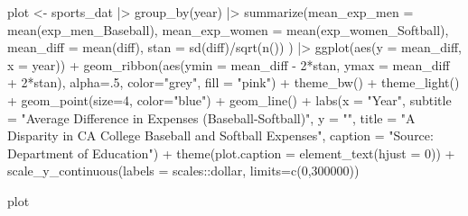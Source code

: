 \documentclass[
  letterpaper,
  DIV=11,
  numbers=noendperiod]{scrartcl}
\newenvironment{Shaded}{\begin{snugshade}}{\end{snugshade}}
\newcommand{\AttributeTok}[1]{\textcolor[rgb]{0.40,0.45,0.13}{#1}}
\newcommand{\DecValTok}[1]{\textcolor[rgb]{0.68,0.00,0.00}{#1}}
\newcommand{\FunctionTok}[1]{\textcolor[rgb]{0.28,0.35,0.67}{#1}}
\newcommand{\NormalTok}[1]{\textcolor[rgb]{0.00,0.23,0.31}{#1}}
\newcommand{\OtherTok}[1]{\textcolor[rgb]{0.00,0.23,0.31}{#1}}
\newcommand{\SpecialCharTok}[1]{\textcolor[rgb]{0.37,0.37,0.37}{#1}}
\newcommand{\StringTok}[1]{\textcolor[rgb]{0.13,0.47,0.30}{#1}}
\begin{document}
\begin{Shaded}
\begin{Highlighting}[]
\NormalTok{plot }\OtherTok{\textless{}{-}}\NormalTok{ sports\_dat }\SpecialCharTok{|\textgreater{}}
  \FunctionTok{group\_by}\NormalTok{(year) }\SpecialCharTok{|\textgreater{}}
  \FunctionTok{summarize}\NormalTok{(}\AttributeTok{mean\_exp\_men =} \FunctionTok{mean}\NormalTok{(exp\_men\_Baseball), }
            \AttributeTok{mean\_exp\_women =} \FunctionTok{mean}\NormalTok{(exp\_women\_Softball),}
            \AttributeTok{mean\_diff =} \FunctionTok{mean}\NormalTok{(diff),}
            \AttributeTok{stan =} \FunctionTok{sd}\NormalTok{(diff)}\SpecialCharTok{/}\FunctionTok{sqrt}\NormalTok{(}\FunctionTok{n}\NormalTok{())}
\NormalTok{  ) }\SpecialCharTok{|\textgreater{}}
  \FunctionTok{ggplot}\NormalTok{(}\FunctionTok{aes}\NormalTok{(}\AttributeTok{y =}\NormalTok{ mean\_diff, }\AttributeTok{x =}\NormalTok{ year)) }\SpecialCharTok{+}
  \FunctionTok{geom\_ribbon}\NormalTok{(}\FunctionTok{aes}\NormalTok{(}\AttributeTok{ymin =}\NormalTok{ mean\_diff }\SpecialCharTok{{-}} \DecValTok{2}\SpecialCharTok{*}\NormalTok{stan, }\AttributeTok{ymax =}\NormalTok{ mean\_diff }\SpecialCharTok{+} \DecValTok{2}\SpecialCharTok{*}\NormalTok{stan), }
              \AttributeTok{alpha=}\NormalTok{.}\DecValTok{5}\NormalTok{, }
              \AttributeTok{color=}\StringTok{"grey"}\NormalTok{,}
              \AttributeTok{fill =} \StringTok{"pink"}\NormalTok{) }\SpecialCharTok{+}
  \FunctionTok{theme\_bw}\NormalTok{() }\SpecialCharTok{+}
  \FunctionTok{theme\_light}\NormalTok{() }\SpecialCharTok{+}
  \FunctionTok{geom\_point}\NormalTok{(}\AttributeTok{size=}\DecValTok{4}\NormalTok{, }\AttributeTok{color=}\StringTok{"blue"}\NormalTok{) }\SpecialCharTok{+}
  \FunctionTok{geom\_line}\NormalTok{() }\SpecialCharTok{+}
  \FunctionTok{labs}\NormalTok{(}\AttributeTok{x =} \StringTok{"Year"}\NormalTok{, }
       \AttributeTok{subtitle =} \StringTok{"Average Difference in Expenses (Baseball{-}Softball)"}\NormalTok{,}
       \AttributeTok{y =} \StringTok{""}\NormalTok{, }
       \AttributeTok{title =} \StringTok{"A Disparity in CA College Baseball and Softball Expenses"}\NormalTok{, }
       \AttributeTok{caption =} \StringTok{"Source: Department of Education"}\NormalTok{) }\SpecialCharTok{+}
  \FunctionTok{theme}\NormalTok{(}\AttributeTok{plot.caption =} \FunctionTok{element\_text}\NormalTok{(}\AttributeTok{hjust =} \DecValTok{0}\NormalTok{)) }\SpecialCharTok{+} 
  \FunctionTok{scale\_y\_continuous}\NormalTok{(}\AttributeTok{labels =}\NormalTok{ scales}\SpecialCharTok{::}\NormalTok{dollar, }\AttributeTok{limits=}\FunctionTok{c}\NormalTok{(}\DecValTok{0}\NormalTok{,}\DecValTok{300000}\NormalTok{)) }

\NormalTok{plot}
\end{Highlighting}
\end{Shaded}
\end{document}
